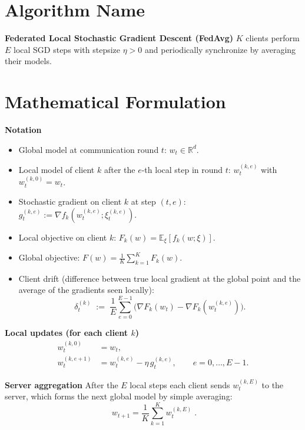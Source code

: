 \documentclass[11pt]{article}
\begin{document}
\section*{Algorithm Name}
\textbf{Federated Local Stochastic Gradient Descent (FedAvg)}  
\(K\) clients perform \(E\) local SGD steps with stepsize \(\eta>0\) and
periodically synchronize by averaging their models.

\section*{Mathematical Formulation}

\noindent\textbf{Notation}
\begin{itemize}
  \item Global model at communication round \(t\): \(w_t\in\mathbb{R}^d\).
  \item Local model of client \(k\) after the \(e\)-th local step in round \(t\):
        \(w_{t}^{(k,e)}\) with \(w_{t}^{(k,0)}=w_t\).
  \item Stochastic gradient on client \(k\) at step \((t,e)\):
        \(g_{t}^{(k,e)}:=\nabla f_k\!\left(w_{t}^{(k,e)};\xi_{t}^{(k,e)}\right)\).
  \item Local objective on client \(k\): \(F_k(w)=\mathbb{E}_{\xi}[f_k(w;\xi)]\).
  \item Global objective: \(F(w)=\frac1K\sum_{k=1}^{K}F_k(w)\).
  \item Client drift (difference between true local gradient at the
        global point and the average of the gradients seen locally):
        \[
        \delta_t^{(k)}\;:=\;\frac1E\sum_{e=0}^{E-1}
        \bigl(\nabla F_k(w_t)-\nabla F_k(w_{t}^{(k,e)})\bigr).
        \]
\end{itemize}

\noindent\textbf{Local updates (for each client \(k\))}  
\[
\boxed{
\begin{aligned}
w_{t}^{(k,0)} &= w_t,\\
w_{t}^{(k,e+1)} &= w_{t}^{(k,e)} - \eta\, g_{t}^{(k,e)},
\qquad e=0,\dots,E-1 .
\end{aligned}}
\tag{1}
\]

\noindent\textbf{Server aggregation}  
After the \(E\) local steps each client sends \(w_{t}^{(k,E)}\) to the
server, which forms the next global model by simple averaging:
\[
\boxed{ \; w_{t+1}= \frac1K\sum_{k=1}^{K} w_{t}^{(k,E)}\; } .
\tag{2}
\]
\end{document}
